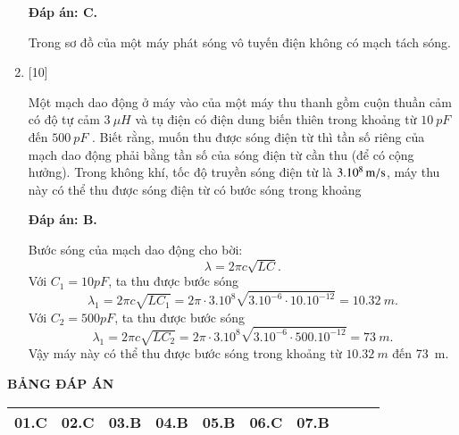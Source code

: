 \begin{enumerate}[label=\bfseries Câu \arabic*:]
	\hideall
	{		\textbf{Đáp án: C.}
		
Trong sơ đồ của một máy phát sóng vô tuyến điện không có mạch tách sóng. 
		
	}

	\item {} [10]
	
	
	{Một mạch dao động ở máy vào của một máy thu thanh gồm cuộn thuần cảm có độ tự cảm $\SI{3}{\mu H}$ và tụ điện có điện dung biến thiên trong khoảng từ $\SI{10}{pF}$ đến $ \SI{500}{pF} $ . Biết rằng, muốn thu được sóng điện từ thì tần số riêng của mạch dao động phải bằng tần số của sóng điện từ cần thu (để có cộng hưởng). Trong không khí, tốc độ truyền sóng điện từ là $ \xsi{3.10^{8}}{m/s} $, máy thu này có thể thu được sóng điện từ có bước sóng trong khoảng

	}
	
	\hideall
	{		\textbf{Đáp án: B.}
		
Bước sóng của mạch dao động cho bời:
$$
\lambda=2 \pi c \sqrt{L C}.
$$
Với $C_{1}=10 p F$, ta thu được bước sóng
$$
\lambda_{1}=2 \pi c \sqrt{L C_{1}}=2 \pi \cdot 3.10^{8} \sqrt{3.10^{-6} \cdot 10.10^{-12}}= \SI{10,32}{m}.
$$
Với $C_{2}=500 p F$, ta thu được bước sóng
$$
\lambda_{1}=2 \pi c \sqrt{L C_{2}}=2 \pi \cdot 3.10^{8} \sqrt{3.10^{-6} \cdot 500.10^{-12}}= \SI{73}{m}.
$$
Vậy máy này có thể thu được bước sóng trong khoảng từ $\SI{10,32}{m}$ đến \SI{73}{m}.
		
	}
	
\end{enumerate}

\hideall
{
	\begin{center}
		\textbf{BẢNG ĐÁP ÁN}
	\end{center}
	\begin{center}
		\begin{tabular}{|m{2.8em}|m{2.8em}|m{2.8em}|m{2.8em}|m{2.8em}|m{2.8em}|m{2.8em}|m{2.8em}|m{2.8em}|m{2.8em}|}
			\hline
			01.C  & 02.C  & 03.B  & 04.B  & 05.B  & 06.C  & 07.B &  &  &  \\
			\hline
			
		\end{tabular}
	\end{center}
}
